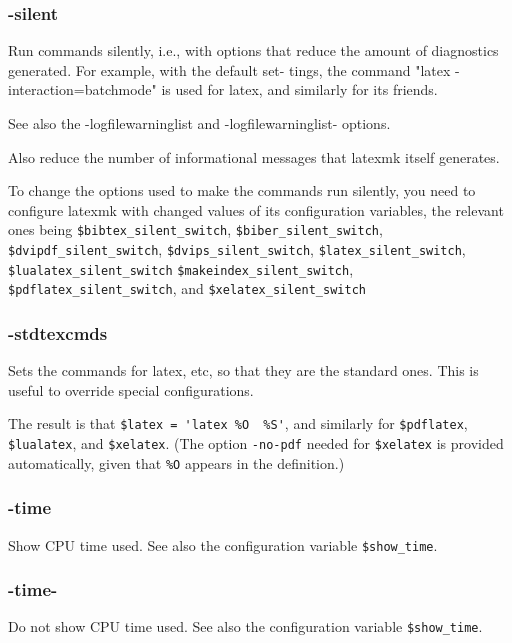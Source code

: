\subsubsection{-silent}

Run commands silently, i.e., with options that reduce the amount of
diagnostics  generated.   For example, with the default set- tings, the command
"latex -interaction=batchmode"  is  used  for latex, and similarly for its
friends.

See  also  the  -logfilewarninglist and -logfilewarninglist- options.

Also reduce the number of informational  messages  that  latexmk
itself generates.

To  change  the  options used to make the commands run silently, you need to
configure latexmk with changed values of its configuration    variables, the
relevant    ones   being   \verb|$bibtex_silent_switch|,
\verb|$biber_silent_switch|,  \verb|$dvipdf_silent_switch|,
\verb|$dvips_silent_switch|, \verb|$latex_silent_switch|,
\verb|$lualatex_silent_switch| \verb|$makeindex_silent_switch|,
\verb|$pdflatex_silent_switch|, and \verb|$xelatex_silent_switch|


\subsubsection{-stdtexcmds}

Sets  the commands for latex, etc, so that they are the standard
ones. This is useful to override special configurations.

The result is that \verb|$latex = 'latex %O  %S'|,  and  similarly  for
\verb|$pdflatex|,  \verb|$lualatex|, and \verb|$xelatex|.  (The option \verb|-no-pdf| needed
for \verb|$xelatex| is provided automatically, given that \verb|%O| appears in
the definition.)


\subsubsection{-time}

Show  CPU  time  used.   See  also  the  configuration  variable
\verb|$show_time|.


\subsubsection{-time-}

Do not show CPU time used.  See also the configuration  variable
\verb|$show_time|.


